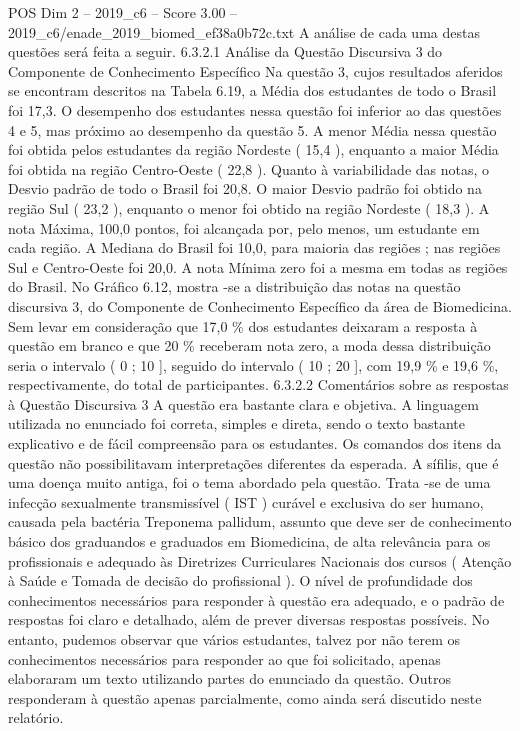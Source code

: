 \begin{textsample}{POS Dim 2 – 2019\_c6 – Score 3.00 – 2019\_c6/enade\_2019\_biomed\_ef38a0b72c.txt}
A análise de cada uma destas questões será feita a seguir. 6.3.2.1 Análise da Questão Discursiva 3 do Componente de Conhecimento Específico Na questão 3, cujos resultados aferidos se encontram descritos na Tabela 6.19, a Média dos estudantes de todo o Brasil foi 17,3.
O desempenho dos estudantes nessa questão foi inferior ao das questões 4 e 5, mas próximo ao desempenho da questão 5.
A menor Média nessa questão foi obtida pelos estudantes da região Nordeste ( 15,4 ), enquanto a maior Média foi obtida na região Centro-Oeste ( 22,8 ).
Quanto à variabilidade das notas, o Desvio padrão de todo o Brasil foi 20,8.
O maior Desvio padrão foi obtido na região Sul ( 23,2 ), enquanto o menor foi obtido na região Nordeste ( 18,3 ).
A nota Máxima, 100,0 pontos, foi alcançada por, pelo menos, um estudante em cada região.
A Mediana do Brasil foi 10,0, para maioria das regiões ; nas regiões Sul e Centro-Oeste foi 20,0.
A nota Mínima zero foi a mesma em todas as regiões do Brasil.
No Gráfico 6.12, mostra -se a distribuição das notas na questão discursiva 3, do Componente de Conhecimento Específico da área de Biomedicina.
Sem levar em consideração que 17,0 \% dos estudantes deixaram a resposta à questão em branco e que 20 \% receberam nota zero, a moda dessa distribuição seria o intervalo ( 0 ; 10 ], seguido do intervalo ( 10 ; 20 ], com 19,9 \% e 19,6 \%, respectivamente, do total de participantes. 6.3.2.2 Comentários sobre as respostas à Questão Discursiva 3 A questão era bastante clara e objetiva.
A linguagem utilizada no enunciado foi correta, simples e direta, sendo o texto bastante explicativo e de fácil compreensão para os estudantes.
Os comandos dos itens da questão não possibilitavam interpretações diferentes da esperada.
A sífilis, que é uma doença muito antiga, foi o tema abordado pela questão.
Trata -se de uma infecção sexualmente transmissível ( IST ) curável e exclusiva do ser humano, causada pela bactéria Treponema pallidum, assunto que deve ser de conhecimento básico dos graduandos e graduados em Biomedicina, de alta relevância para os profissionais e adequado às Diretrizes Curriculares Nacionais dos cursos ( Atenção à Saúde e Tomada de decisão do profissional ).
O nível de profundidade dos conhecimentos necessários para responder à questão era adequado, e o padrão de respostas foi claro e detalhado, além de prever diversas respostas possíveis.
No entanto, pudemos observar que vários estudantes, talvez por não terem os conhecimentos necessários para responder ao que foi solicitado, apenas elaboraram um texto utilizando partes do enunciado da questão.
Outros responderam à questão apenas parcialmente, como ainda será discutido neste relatório.

\end{textsample}
